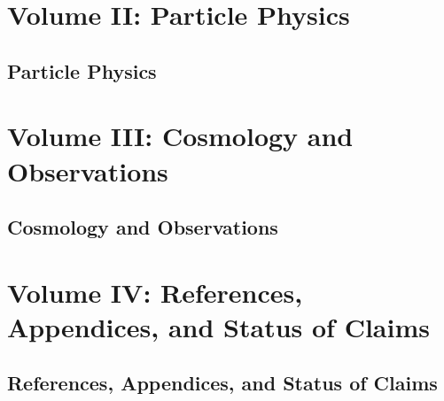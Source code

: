\documentclass[12pt,oneside]{book}
\begin{document}
\part{Volume II: Particle Physics}
\chapter*{Particle Physics}

\part{Volume III: Cosmology and Observations}
\chapter*{Cosmology and Observations}

\part{Volume IV: References, Appendices, and Status of Claims}
\chapter*{References, Appendices, and Status of Claims}
\end{document}
